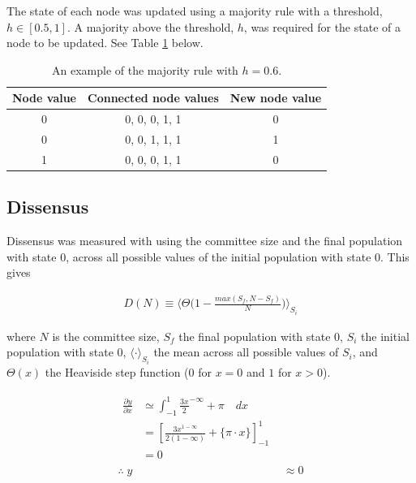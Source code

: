 \documentclass[a4paper, 10pt]{IEEEtran}
\begin{document}
The state of each node was updated using a majority rule with a threshold, $h \in [0.5, 1]$. A majority above the threshold, $h$, was required for the state of a node to be updated. See Table \ref{tab:majority} below.

\begin{center} %
	\begin{minipage}{.7\linewidth} %
	\begin{table}[H]
		\centering %
		\renewcommand{\arraystretch}{1.3} %
		\caption{An example of the majority rule with $h = 0.6$.}
		\label{tab:majority}
		\begin{tabular}{c | c | c} %
			Node value & Connected node values & New node value\\ \hline \hline %
			0 & 0, 0, 0, 1, 1 & 0 \\ \hline
			0 & 0, 0, 1, 1, 1 & 1 \\ \hline
			1 & 0, 0, 0, 1, 1 & 0 \\ \hline
		\end{tabular}
	\end{table}
	\end{minipage}
\end{center}


\subsection{Dissensus}
\label{sub:dissensus}

Dissensus was measured with using the committee size and  the final population with state $0$, across all possible values of the initial population with  state $0$.  This gives

\begin{align}
\label{eq:dissensus}
D(N) \equiv \Biggl\langle \Theta \Biggl(1 - \frac{max(S_f, N - S_f)}{N}\Biggr)\Biggr \rangle_{S_i}
\end{align}

where $N$ is the committee size, $S_f$ the final population with  state $0$, $S_i$ the initial population with state $0$, $\langle \cdot \rangle_{S_i}$ the mean across all possible values of $S_i$, and $\Theta (x)$ the Heaviside step function ($0$ for $x = 0$ and $1$ for $x > 0$). 

\begin{align}
\label{eq:intrest}
\begin{split}
	\frac{\partial y}{\partial x} &\simeq \int_{-1}^{1} { \frac{3x}{2} }^{ -\infty } + \pi \quad dx \\ %
	&= \left[ \frac{ 3x^ { 1 - \infty } }{ 2 ( 1 - \infty ) } + \{ \pi \cdot x \} \right] ^{1}_{-1} \\
	&= 0
\end{split} \\[10pt]
\therefore \; y &\approx 0 %
\end{align}
\end{document}
